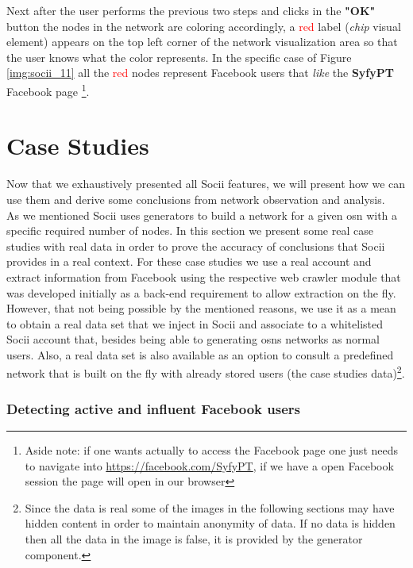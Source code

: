 \indent Next after the user performs the previous two steps and clicks in the \textbf{"OK"} button the nodes in the network are coloring accordingly, a \textcolor{red}{red} label (\textit{chip} visual element) appears on the top left corner of the network visualization area so that the user knows what the color represents. In the specific case of Figure \ref{img:socii_11} all the \textcolor{red}{red} nodes represent Facebook users that \textit{like} the \textbf{SyfyPT} Facebook page \footnote{Aside note: if one wants actually to access the Facebook page one just needs to navigate into \url{https://facebook.com/SyfyPT}, if we have a open Facebook session the page will open in our browser}.

\newpage
\section{Case Studies}
Now that we exhaustively presented all Socii features, we will present how we can use them and derive some conclusions from network observation and analysis.\\
\indent As we mentioned Socii uses generators to build a network for a given \gls{osn} with a specific required number of nodes. In this section we present some real case studies with real data in order to prove the accuracy of conclusions that Socii provides in a real context. For these case studies we use a real account and extract information from Facebook using the respective web crawler module that was developed initially as a back-end requirement to allow extraction on the fly. However, that not being possible by the mentioned reasons, we use it as a mean to obtain a real data set that we inject in Socii and associate to a whitelisted Socii account that, besides being able to generating \glspl{osn} networks as normal users. Also, a real data set is also available as an option to consult a predefined network that is built on the fly with already stored users (the case studies data)\footnote{Since the data is real some of the images in the following sections may have hidden content in order to maintain anonymity of data. If no data is hidden then all the data in the image is false, it is provided by the generator component.}.

\subsubsection{Detecting active and influent Facebook users}

